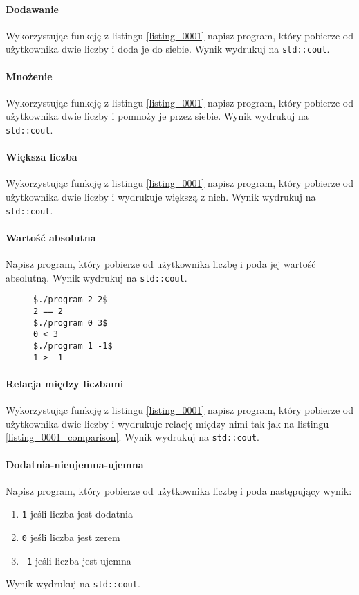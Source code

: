 \documentclass[11pt,a4paper,titlepage,onecolumn]{article}
\begin{document}
\paragraph{Dodawanie} Wykorzystując funkcję z listingu \ref{listing_0001} napisz
program, który pobierze od użytkownika dwie liczby i doda je do siebie. Wynik
wydrukuj na \texttt{std::cout}.

\paragraph{Mnożenie} Wykorzystując funkcję z listingu \ref{listing_0001} napisz
program, który pobierze od użytkownika dwie liczby i pomnoży je przez siebie.
Wynik wydrukuj na \texttt{std::cout}.

\paragraph{Większa liczba} Wykorzystując funkcję z listingu \ref{listing_0001} napisz
program, który pobierze od użytkownika dwie liczby i wydrukuje większą z nich.
Wynik wydrukuj na \texttt{std::cout}.

\paragraph{Wartość absolutna} Napisz program, który pobierze od użytkownika
liczbę i poda jej wartość absolutną. Wynik wydrukuj na \texttt{std::cout}.

\begin{figure}[!htp]
\begin{lstlisting}[caption={relacja między liczbami},
    captionpos=b,
    label=listing_0001_comparison]
$./program 2 2$
2 == 2
$./program 0 3$
0 < 3
$./program 1 -1$
1 > -1
\end{lstlisting}
\end{figure}

\paragraph{Relacja między liczbami}\label{ex_0001_relationship_between_numbers}
Wykorzystując funkcję z listingu \ref{listing_0001} napisz program, który
pobierze od użytkownika dwie liczby i wydrukuje relację między nimi tak jak na
listingu \ref{listing_0001_comparison}.
Wynik wydrukuj na \texttt{std::cout}.

\paragraph{Dodatnia-nieujemna-ujemna} Napisz program, który pobierze od
użytkownika liczbę i poda następujący wynik:
\begin{enumerate}
    \item \texttt{1} jeśli liczba jest dodatnia
    \item \texttt{0} jeśli liczba jest zerem
    \item \texttt{-1} jeśli liczba jest ujemna
\end{enumerate}
Wynik wydrukuj na \texttt{std::cout}.
\end{document}
